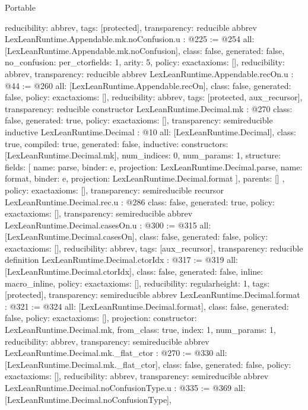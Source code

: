 \begin{lexlean}{Portable}
\begin{coremodule}
{  reducibility: abbrev{},
  tags: [protected],
  transparency: reducible
}
abbrev LexLeanRuntime.Appendable.mk.noConfusion.{u} : @225 := @254 {
  all: [LexLeanRuntime.Appendable.mk.noConfusion],
  class: false,
  generated: false,
  no_confusion: per_ctor{fields: 1, arity: 5},
  policy: exact{axioms: []},
  reducibility: abbrev{},
  transparency: reducible
}
abbrev LexLeanRuntime.Appendable.recOn.{u} : @44 := @260 {
  all: [LexLeanRuntime.Appendable.recOn],
  class: false,
  generated: false,
  policy: exact{axioms: []},
  reducibility: abbrev{},
  tags: [protected, aux_recursor],
  transparency: reducible
}
constructor LexLeanRuntime.Decimal.mk : @270 {
  class: false,
  generated: true,
  policy: exact{axioms: []},
  transparency: semireducible
}
inductive LexLeanRuntime.Decimal : @10 {
  all: [LexLeanRuntime.Decimal],
  class: true,
  compiled: true,
  generated: false,
  inductive: {
    constructors: [LexLeanRuntime.Decimal.mk],
    num_indices: 0,
    num_params: 1,
    structure: {
      fields: [
        {name: parse, binder: e, projection: LexLeanRuntime.Decimal.parse},
        {name: format, binder: e, projection: LexLeanRuntime.Decimal.format}
      ],
      parents: []
    }
  },
  policy: exact{axioms: []},
  transparency: semireducible
}
recursor LexLeanRuntime.Decimal.rec.{u} : @286 {
  class: false,
  generated: true,
  policy: exact{axioms: []},
  transparency: semireducible
}
abbrev LexLeanRuntime.Decimal.casesOn.{u} : @300 := @315 {
  all: [LexLeanRuntime.Decimal.casesOn],
  class: false,
  generated: false,
  policy: exact{axioms: []},
  reducibility: abbrev{},
  tags: [aux_recursor],
  transparency: reducible
}
definition LexLeanRuntime.Decimal.ctorIdx : @317 := @319 {
  all: [LexLeanRuntime.Decimal.ctorIdx],
  class: false,
  generated: false,
  inline: macro_inline,
  policy: exact{axioms: []},
  reducibility: regular{height: 1},
  tags: [protected],
  transparency: semireducible
}
abbrev LexLeanRuntime.Decimal.format : @321 := @324 {
  all: [LexLeanRuntime.Decimal.format],
  class: false,
  generated: false,
  policy: exact{axioms: []},
  projection: {constructor: LexLeanRuntime.Decimal.mk, from_class: true, index: 1, num_params: 1},
  reducibility: abbrev{},
  transparency: semireducible
}
abbrev LexLeanRuntime.Decimal.mk._flat_ctor : @270 := @330 {
  all: [LexLeanRuntime.Decimal.mk._flat_ctor],
  class: false,
  generated: false,
  policy: exact{axioms: []},
  reducibility: abbrev{},
  transparency: semireducible
}
abbrev LexLeanRuntime.Decimal.noConfusionType.{u} : @335 := @369 {
  all: [LexLeanRuntime.Decimal.noConfusionType],
}
\end{coremodule}
\end{lexlean}
